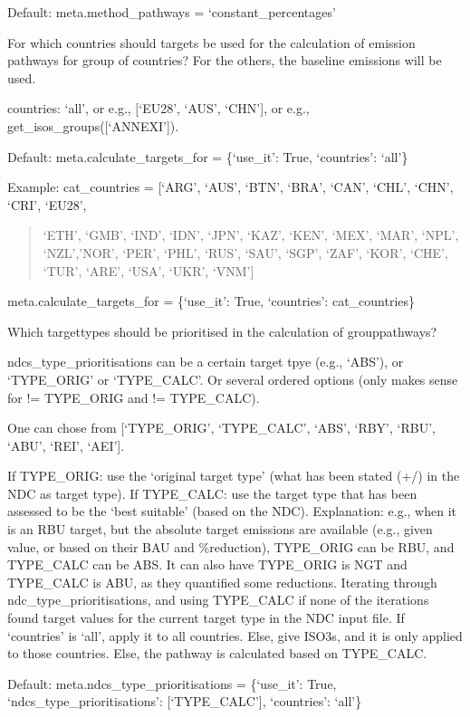 \documentclass[letterpaper,10pt,english]{sphinxmanual}
\begin{document}
Default:
meta.method\_pathways = ‘constant\_percentages’

For which countries should targets be used for the calculation of emission pathways for group of countries?
For the others, the baseline emissions will be used.

countries: ‘all’, or e.g., {[}‘EU28’, ‘AUS’, ‘CHN’{]}, or e.g., get\_isos\_groups({[}‘ANNEXI’{]}).

Default:
meta.calculate\_targets\_for = \{‘use\_it’: True, ‘countries’: ‘all’\}

Example:
cat\_countries = {[}‘ARG’, ‘AUS’, ‘BTN’, ‘BRA’, ‘CAN’, ‘CHL’, ‘CHN’, ‘CRI’, ‘EU28’,
\begin{quote}

‘ETH’, ‘GMB’, ‘IND’, ‘IDN’, ‘JPN’, ‘KAZ’, ‘KEN’, ‘MEX’, ‘MAR’,
‘NPL’, ‘NZL’,’NOR’, ‘PER’, ‘PHL’, ‘RUS’, ‘SAU’, ‘SGP’, ‘ZAF’,
‘KOR’, ‘CHE’, ‘TUR’, ‘ARE’, ‘USA’, ‘UKR’, ‘VNM’{]}
\end{quote}

meta.calculate\_targets\_for = \{‘use\_it’: True, ‘countries’: cat\_countries\}

Which target\sphinxhyphen{}types should be prioritised in the calculation of group\sphinxhyphen{}pathways?

ndcs\_type\_prioritisations can be a certain target tpye (e.g., ‘ABS’), or ‘TYPE\_ORIG’ or ‘TYPE\_CALC’.
Or several ordered options (only makes sense for != TYPE\_ORIG and != TYPE\_CALC).

One can chose from {[}‘TYPE\_ORIG’, ‘TYPE\_CALC’, ‘ABS’, ‘RBY’, ‘RBU’, ‘ABU’, ‘REI’, ‘AEI’{]}.

If TYPE\_ORIG: use the ‘original target type’ (what has been stated (+/\sphinxhyphen{})
in the NDC as target type).
If TYPE\_CALC: use the target type that has been assessed to be the ‘best
suitable’ (based on the NDC).
Explanation: e.g., when it is an RBU target, but the absolute target emissions are available
(e.g., given value, or based on their BAU and \%\sphinxhyphen{}reduction),
TYPE\_ORIG can be RBU, and TYPE\_CALC can be ABS. It can also have TYPE\_ORIG is
NGT and TYPE\_CALC is ABU, as they quantified some reductions.
Iterating through ndc\_type\_prioritisations, and using TYPE\_CALC if none of the iterations
found target values for the current target type in the NDC input file.
If ‘countries’ is ‘all’, apply it to all countries. Else, give ISO3s, and it
is only applied to those countries.
Else, the pathway is calculated based on TYPE\_CALC.

Default:
meta.ndcs\_type\_prioritisations = \{‘use\_it’: True, ‘ndcs\_type\_prioritisations’: {[}‘TYPE\_CALC’{]}, ‘countries’: ‘all’\}
\end{document}
